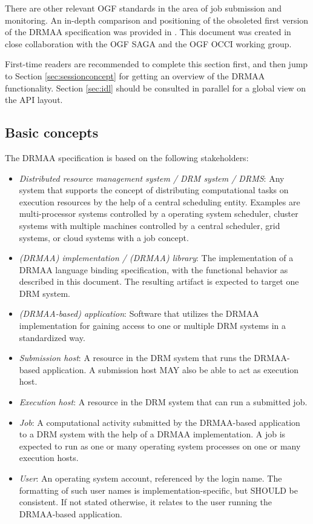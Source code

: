 \documentclass{article}
\begin{document}
There are other relevant OGF standards in the area of job submission and monitoring. An in-depth comparison and positioning of the obsoleted first version of the DRMAA \cite{gfd.133} specification was provided in \cite{drmaa09}. This document was created in close collaboration with the OGF SAGA and the OGF OCCI working group.

First-time readers are recommended to complete this section first, and then jump to Section \ref{sec:sessionconcept} for getting an overview of the DRMAA functionality. Section \ref{sec:idl} should be consulted in parallel for a global view on the API layout.

\subsection{Basic concepts}
\label{sec:concepts}

The DRMAA specification is based on the following stakeholders:

\begin{itemize}
	\item \emph{Distributed resource management system / DRM system / DRMS}: Any system that supports the concept of distributing computational tasks on execution resources by the help of a central scheduling entity. Examples are multi-processor systems controlled by a operating system scheduler, cluster systems with multiple machines controlled by a central scheduler, grid systems, or cloud systems with a job concept.
	\item \emph{(DRMAA) implementation / (DRMAA) library}: The implementation of a DRMAA language binding specification, with the functional behavior as described in this document. The resulting artifact is expected to target one DRM system.
	\item \emph{(DRMAA-based) application}: Software that utilizes the DRMAA implementation for gaining access to one or multiple DRM systems in a standardized way.
	\item \emph{Submission host}: A resource in the DRM system that runs the DRMAA-based application. A submission host MAY also be able to act as execution host.
	\item \emph{Execution host}: A resource in the DRM system that can run a submitted job.
	\item \emph{Job}: A computational activity submitted by the DRMAA-based application to a DRM system with the help of a DRMAA implementation. A job is expected to run as one or many operating system processes on one or many execution hosts. 
	\item \emph{User}: An operating system account, referenced by the login name. The formatting of such user names is implementation-specific, but SHOULD be consistent. If not stated otherwise, it relates to the user running the DRMAA-based application.
\end{itemize}
\end{document}
